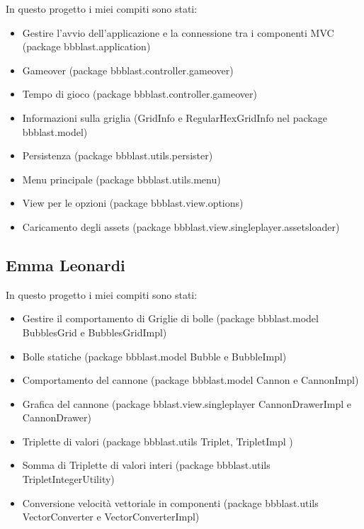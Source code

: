 \documentclass[a4paper,12pt]{report}
\begin{document}
In questo progetto i miei compiti sono stati:
\begin{itemize}
	\item Gestire l'avvio dell'applicazione e la connessione tra i componenti MVC (package bbblast.application)
	\item Gameover (package bbblast.controller.gameover)
	\item Tempo di gioco (package bbblast.controller.gameover)
	\item Informazioni sulla griglia (GridInfo e RegularHexGridInfo nel package bbblast.model)
	\item Persistenza (package bbblast.utils.persister)
	\item Menu principale (package bbblast.utils.menu)
	\item View per le opzioni (package bbblast.view.options)
	\item Caricamento degli assets (package bbblast.view.singleplayer.assetsloader)
\end{itemize}

\subsection{Emma Leonardi}

In questo progetto i miei compiti sono stati:
\begin{itemize}
	\item Gestire il comportamento di Griglie di bolle (package bbblast.model BubblesGrid e BubblesGridImpl)
	\item Bolle statiche (package bbblast.model Bubble e BubbleImpl)
	\item Comportamento del cannone (package bbblast.model Cannon e CannonImpl)
	\item Grafica del cannone (package bblast.view.singleplayer CannonDrawerImpl e CannonDrawer)
	\item Triplette di valori (package bbblast.utils Triplet, TripletImpl )
	\item Somma di Triplette di valori interi (package bbblast.utils TripletIntegerUtility)
	\item Conversione velocità vettoriale in componenti (package bbblast.utils VectorConverter e VectorConverterImpl)
\end{itemize}
\end{document}
